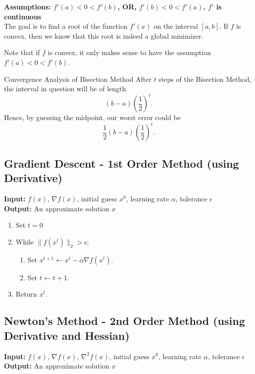 \textbf{Assumptions: $f'(a)<0 <  f'(b)$, OR, $f'(b) < 0 < f'(a)$.  $f'$ is continuous}\\
The goal is to find a root of the function $f'(x)$ on the interval $[a,b]$.  If $f$ is convex, then we know that this root is indeed a global minimizer.


Note that if $f$ is convex, it only makes sense to have the assumption $f'(a)<0 <  f'(b)$.






\begin{general}{Convergence Analysis of Bisection Method}{}
After $t$ steps of the Bisection Method, the interval in question will be of length
$$
(b-a)\left(\frac{1}{2}\right)^t.
$$
Hence, by guessing the midpoint, our worst error could be
$$
\frac{1}{2}(b-a)\left(\frac{1}{2}\right)^t.
$$
\end{general}

\subsection{Gradient Descent - 1st Order Method (using Derivative)}
\textbf{Input:} $f(x)$, $\nabla f(x)$, initial guess $x^0$, learning rate $\alpha$, tolerance $\epsilon$\\
\textbf{Output:} An approximate solution $x$

\begin{enumerate}
\item Set $t= 0$
\item While $\| f(x^t)\|_2 > \epsilon$:
\begin{enumerate}
\item Set $x^{t+1} \leftarrow x^t- \alpha \nabla f(x^t)$.
\item Set $t \leftarrow t+1$.
\end{enumerate}
\item Return $x^{t}$.
\end{enumerate}



\subsection{Newton's Method - 2nd Order Method (using Derivative and Hessian)}

\textbf{Input:} $f(x)$, $\nabla f(x)$, $\nabla^2f(x)$, initial guess $x^0$, learning rate $\alpha$, tolerance $\epsilon$\\
\textbf{Output:} An approximate solution $x$

